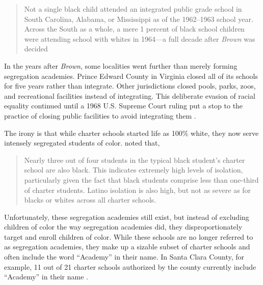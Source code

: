 \blockquote[{\parencite[223]{Alexander2011}}][]{\OnehalfSpacing%
Not a single black child attended an integrated public grade school in South Carolina, Alabama, or Mississippi as of the 1962–1963 school year. Across the South as a whole, a mere 1 percent of black school children were attending school with whites in 1964—a full decade after \textit{Brown} was decided}.\vspace{-0.25\baselineskip}

In the years after \textit{Brown}, some localities went further than merely forming segregation academies. Prince Edward County in Virginia closed all of its schools for five years rather than integrate. Other jurisdictions closed pools, parks, zoos, and recreational facilities instead of integrating. This deliberate evasion of racial equality continued until a 1968 U.S. Supreme Court ruling put a stop to the practice of closing public facilities to avoid integrating them \parencite{Brennan1968}.

The irony is that while charter schools started life as 100\% white, they now serve intensely segregated students of color. \textcite[47]{Frankenberg.etal2019} noted that,

\blockquote[][]{\OnehalfSpacing%
Nearly three out of four students in the typical black student's charter school are also black. This indicates extremely high levels of isolation, particularly given the fact that black students comprise less than one-third of charter students. Latino isolation is also high, but not as severe as for blacks or whites across all charter schools.}\vspace{-0.25\baselineskip}

Unfortunately, these segregation academies still exist, but instead of excluding children of color the way segregation academies did, they disproportionately target and enroll children of color. While these schools are no longer referred to as segregation academies, they make up a sizable subset of charter schools and often include the word ``Academy'' in their name. In Santa Clara County, for example, 11 out of 21 charter schools authorized by the county currently include ``Academy'' in their name \parencite{SCCOE2023}.

